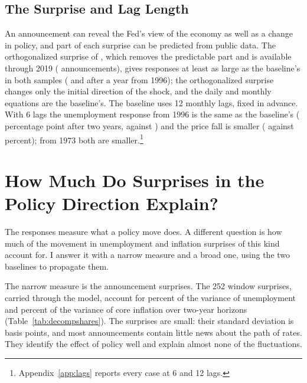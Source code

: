 \documentclass[11pt]{article}
\begin{document}
\subsection{The Surprise and Lag Length}\label{sec:surprise}
An announcement can reveal the Fed's view of the economy as well as a change in policy, and part of each surprise can be predicted from public data. The orthogonalized surprise of \citet{bauer2023}, which removes the predictable part and is available through 2019 ( announcements), gives responses at least as large as the baseline's in both samples ( and  after a year from 1996); the orthogonalized surprise changes only the initial direction of the shock, and the daily and monthly equations are the baseline's. The baseline uses 12 monthly lags, fixed in advance. With 6 lags the unemployment response from 1996 is the same as the baseline's ( percentage point after two years, against ) and the price fall is smaller ( against  percent); from 1973 both are smaller.\footnote{Appendix~\ref{app:lags} reports every case at 6 and 12 lags.}

\FloatBarrier
\section{How Much Do Surprises in the Policy Direction Explain?}\label{sec:shares}
The responses measure what a policy move does. A different question is how much of the movement in unemployment and inflation surprises of this kind account for. I answer it with a narrow measure and a broad one, using the two baselines to propagate them.

The narrow measure is the announcement surprises. The 252 window surprises, carried through the model, account for  percent of the variance of unemployment and  percent of the variance of core inflation over two-year horizons (Table~\ref{tab:decompshares}). The surprises are small: their standard deviation is  basis points, and most announcements contain little news about the path of rates. They identify the effect of policy well and explain almost none of the fluctuations.
\end{document}
